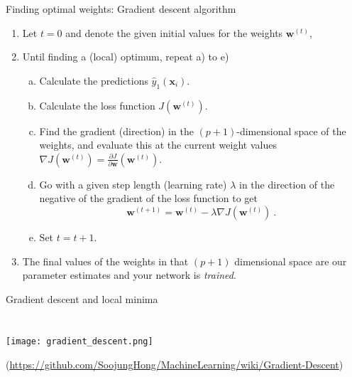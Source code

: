 \documentclass[10pt,ignorenonframetext,]{beamer}
\providecommand{\tightlist}{%
  \setlength{\itemsep}{0pt}\setlength{\parskip}{0pt}}
\begin{document}
\begin{frame}

\begin{block}{Finding optimal weights: Gradient descent algorithm}

\vspace{2mm}

\begin{enumerate}
\tightlist
\item
  Let \(t=0\) and denote the given initial values for the weights
  \({\boldsymbol w}^{(t)}\), \vspace{2mm}
\item
  Until finding a (local) optimum, repeat a) to e)

  \begin{enumerate}
  [a)]
  \tightlist
  \item
    Calculate the predictions \({\hat{y}_1({\boldsymbol x}_i)}\).
  \item
    Calculate the loss function \(J({\boldsymbol w}^{(t)})\).
  \item
    Find the gradient (direction) in the \((p+1)\)-dimensional space of
    the weights, and evaluate this at the current weight values
    \(\nabla J({\boldsymbol w}^{(t)})={\frac{\partial J}{\partial {\boldsymbol w}}}({\boldsymbol w}^{(t)})\).
  \item
    Go with a given step length (learning rate) \(\lambda\) in the
    direction of the negative of the gradient of the loss function to
    get
    \[{\boldsymbol w}^{(t+1)}={\boldsymbol w}^{(t)} - \lambda \nabla J({\boldsymbol w}^{(t)}) \ .\]
  \item
    Set \(t=t+1\). \vspace{2mm}
  \end{enumerate}
\item
  The final values of the weights in that \((p+1)\) dimensional space
  are our parameter estimates and your network is \emph{trained}.
\end{enumerate}

\end{block}

\end{frame}

\begin{frame}

\begin{block}{Gradient descent and local minima}

\(~\)

\(~\)

\center

\texttt{[image: gradient\_descent.png]}

\tiny (\url{https://github.com/SoojungHong/MachineLearning/wiki/Gradient-Descent})

\(~\)

\end{block}

\end{frame}
\end{document}
